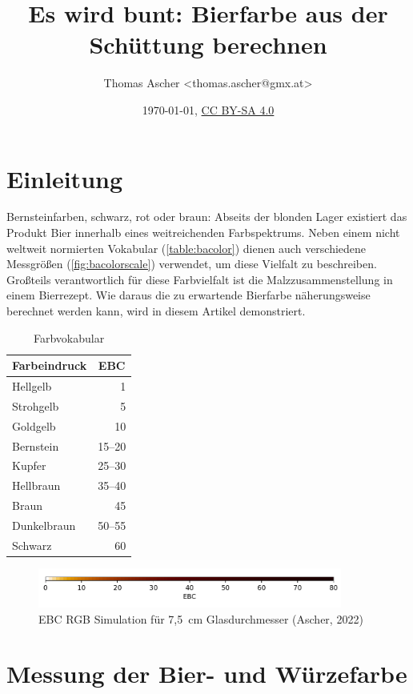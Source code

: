 \documentclass[a4paper,parskip=half]{scrartcl}
\title{Es wird bunt: Bierfarbe aus der Schüttung berechnen}
\author{Thomas Ascher <thomas.ascher@gmx.at>}
\date{\today, \href{http://creativecommons.org/licenses/by-sa/4.0/}{CC BY-SA 4.0}}
\begin{document}
\maketitle

\section*{Einleitung}

Bernsteinfarben, schwarz, rot oder braun: Abseits der blonden Lager existiert das Produkt Bier innerhalb eines weitreichenden Farbspektrums. Neben einem nicht weltweit normierten Vokabular (\autoref{table:bacolor}) dienen auch verschiedene Messgrößen (\autoref{fig:bacolorscale}) verwendet, um diese Vielfalt zu beschreiben. Großteils verantwortlich für diese Farbvielfalt ist die Malzzusammenstellung in einem Bierrezept. Wie daraus die zu erwartende Bierfarbe näherungsweise berechnet werden kann, wird in diesem Artikel demonstriert.

\begin{table}[H]
\centering
\begin{tabular}{lr}
\toprule
\multicolumn{1}{c}{\textbf{Farbeindruck}} & \multicolumn{1}{c}{\textbf{EBC}} \\
\midrule
Hellgelb & 1 \\
Strohgelb & 5 \\
Goldgelb & 10 \\
Bernstein & 15–20 \\
Kupfer & 25–30 \\
Hellbraun & 35–40 \\
Braun & 45 \\
Dunkelbraun & 50–55 \\
Schwarz & 60 \\
\bottomrule
\end{tabular}
\caption{Farbvokabular \parencite[34]{Bruecklmeier2018}}
\label{table:bacolor}
\end{table}

\begin{figure}[h]
\centering
\includegraphics[width=10cm]{colorscale.pdf}
\caption{EBC RGB Simulation für 7,5~cm Glasdurchmesser (Ascher, 2022)}
\label{fig:bacolorscale}
\end{figure}

\section*{Messung der Bier- und Würzefarbe}
\end{document}
